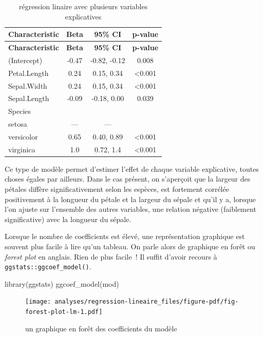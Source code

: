 \documentclass[
  letterpaper,
  DIV=11,
  numbers=noendperiod,
  oneside]{scrreprt}
\newenvironment{Shaded}{\begin{snugshade}}{\end{snugshade}}
\newcommand{\FunctionTok}[1]{\textcolor[rgb]{0.28,0.35,0.67}{#1}}
\newcommand{\NormalTok}[1]{\textcolor[rgb]{0.00,0.23,0.31}{#1}}
\begin{document}
\hypertarget{tbl-regression-lm-3}{}
\begin{longtable}[]{@{}lccc@{}}
\caption{\label{tbl-regression-lm-3}régression linaire avec plusieurs
variables explicatives}\tabularnewline
\toprule()
\textbf{Characteristic} & \textbf{Beta} & \textbf{95\% CI} &
\textbf{p-value} \\
\midrule()
\endfirsthead
\toprule()
\textbf{Characteristic} & \textbf{Beta} & \textbf{95\% CI} &
\textbf{p-value} \\
\midrule()
\endhead
(Intercept) & -0.47 & -0.82, -0.12 & 0.008 \\
Petal.Length & 0.24 & 0.15, 0.34 & \textless0.001 \\
Sepal.Width & 0.24 & 0.15, 0.34 & \textless0.001 \\
Sepal.Length & -0.09 & -0.18, 0.00 & 0.039 \\
Species & & & \\
setosa & --- & --- & \\
versicolor & 0.65 & 0.40, 0.89 & \textless0.001 \\
virginica & 1.0 & 0.72, 1.4 & \textless0.001 \\
\bottomrule()
\end{longtable}

Ce type de modèle permet d'estimer l'effet de chaque variable
explicative, toutes choses égales par ailleurs. Dans le cas présent, on
s'aperçoit que la largeur des pétales diffère significativement selon
les espèces, est fortement corrélée positivement à la longueur du pétale
et la largeur du sépale et qu'il y a, lorsque l'on ajuste sur l'ensemble
des autres variables, une relation négative (faiblement significative)
avec la longueur du sépale.

Lorsque le nombre de coefficients est élevé, une représentation
graphique est souvent plus facile à lire qu'un tableau. On parle alors
de graphique en forêt ou \emph{forest plot} en anglais. Rien de plus
facile~! Il suffit d'avoir recours à \texttt{ggstats::ggcoef\_model()}.

\begin{Shaded}
\begin{Highlighting}[]
\FunctionTok{library}\NormalTok{(ggstats)}
\FunctionTok{ggcoef\_model}\NormalTok{(mod)}
\end{Highlighting}
\end{Shaded}

\begin{figure}[H]

{\centering \texttt{[image: analyses/regression-lineaire\_files/figure-pdf/fig-forest-plot-lm-1.pdf]}

}

\caption{\label{fig-forest-plot-lm}un graphique en forêt des
coefficients du modèle}

\end{figure}
\end{document}
